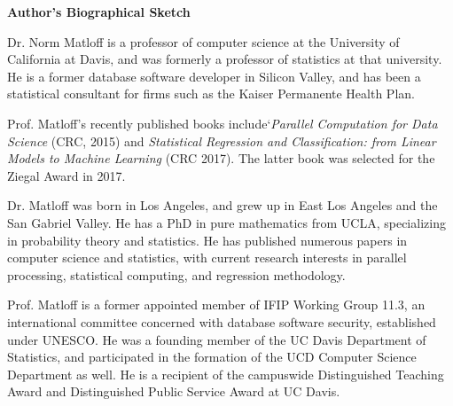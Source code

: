 \begin{center}
{\bf Author's Biographical Sketch}
\end{center}

Dr. Norm Matloff is a professor of computer science at the University of
California at Davis, and was formerly a professor of statistics at that
university. He is a former database software developer in Silicon
Valley, and has been a statistical consultant for firms such as the
Kaiser Permanente Health Plan.

Prof. Matloff's recently published books include`\textit{Parallel
Computation for Data Science} (CRC, 2015) and \textit{Statistical
Regression and Classification: from Linear Models to Machine Learning}
(CRC 2017).  The latter book was selected for the Ziegal Award in 2017.

Dr. Matloff was born in Los Angeles, and grew up in East Los Angeles and
the San Gabriel Valley. He has a PhD in pure mathematics from UCLA,
specializing in probability theory and statistics.  He has published
numerous papers in computer science and statistics, with current
research interests in parallel processing, statistical computing,
and regression methodology.

Prof. Matloff is a former appointed member of IFIP Working Group 11.3,
an international committee concerned with database software security,
established under UNESCO.  He was a founding member of the UC Davis
Department of Statistics, and participated in the formation of the UCD
Computer Science Department as well.  He is a recipient of the
campuswide Distinguished Teaching Award and Distinguished Public Service
Award at UC Davis.

